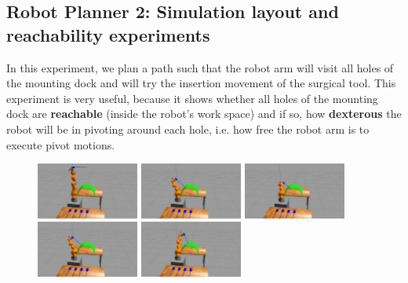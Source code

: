 \subsection{Robot Planner 2: Simulation layout and reachability experiments}

In this experiment, we plan a path such that the robot arm will visit all holes of the mounting dock and will try the insertion movement of the surgical tool.
This experiment is very useful, because it shows whether all holes of the mounting dock are \textbf{reachable} (inside the robot's work space) and if so, how 
\textbf{dexterous} the robot will be in pivoting around each hole, i.e. how free the robot arm is to execute pivot motions.

\begin{center}
\begin{figure}[H]
\centering
\includegraphics[width=0.3\textwidth]{images/robot_planner2/robot_planner2_1}
\includegraphics[width=0.3\textwidth]{images/robot_planner2/robot_planner2_2}
\includegraphics[width=0.3\textwidth]{images/robot_planner2/robot_planner2_3}\\
\includegraphics[width=0.3\textwidth]{images/robot_planner2/robot_planner2_4}
\includegraphics[width=0.3\textwidth]{images/robot_planner2/robot_planner2_5}

\end{figure}
\end{center}
